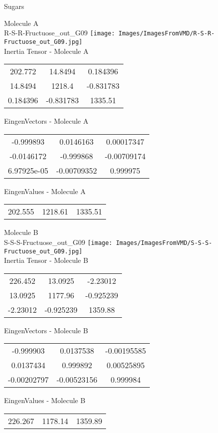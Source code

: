 \vtab[-2cm]
\begin{center}
{\large Sugars}
\end{center}
\begin{multicols}{2}
\begin{center}
Molecule A \\ 
R-S-R-Fructuose\_out\_G09
\texttt{[image: Images/ImagesFromVMD/R-S-R-Fructuose\_out\_G09.jpg]}
\\
Inertia Tensor - Molecule A \\
\vtab
\begin{tabular}{|c c c|}
202.772	 & 	14.8494	 & 	0.184396	 \\
14.8494	 & 	1218.4	 & 	-0.831783	 \\
0.184396	 & 	-0.831783	 & 	1335.51
\end{tabular}

\vtab
 EingenVectors - Molecule A     \\
\vtab
\begin{tabular}{|c c c|}
-0.999893	 & 	0.0146163	 & 	0.00017347	 \\
-0.0146172	 & 	-0.999868	 & 	-0.00709174	 \\
6.97925e-05	 & 	-0.00709352	 & 	0.999975
\end{tabular}

\vtab
 EingenValues - Molecule A     \\
\vtab
\begin{tabular}{|c c c|}
202.555	 & 	1218.61	 & 	1335.51
\end{tabular}
\columnbreak

Molecule B \\ 
S-S-S-Fructuose\_out\_G09
\texttt{[image: Images/ImagesFromVMD/S-S-S-Fructuose\_out\_G09.jpg]}
\\
Inertia Tensor - Molecule B \\
\vtab
\begin{tabular}{|c c c|}
226.452	 & 	13.0925	 & 	-2.23012	 \\
13.0925	 & 	1177.96	 & 	-0.925239	 \\
-2.23012	 & 	-0.925239	 & 	1359.88
\end{tabular}

\vtab
 EingenVectors - Molecule B     \\
\vtab
\begin{tabular}{|c c c|}
-0.999903	 & 	0.0137538	 & 	-0.00195585	 \\
0.0137434	 & 	0.999892	 & 	0.00525895	 \\
-0.00202797	 & 	-0.00523156	 & 	0.999984
\end{tabular}

\vtab
 EingenValues - Molecule B     \\
\vtab
\begin{tabular}{|c c c|}
226.267	 & 	1178.14	 & 	1359.89
\end{tabular}

\end{center}
\end{multicols}
